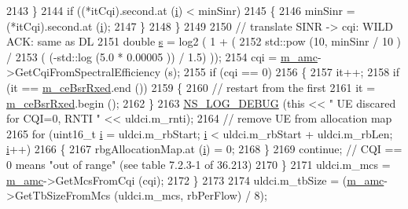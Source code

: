 \begin{DoxyCode}
2143                 \}
2144               \textcolor{keywordflow}{if} ((*itCqi).second.at (\hyperlink{bernuolliDistribution_8m_a6f6ccfcf58b31cb6412107d9d5281426}{i}) < minSinr)
2145                 \{
2146                   minSinr = (*itCqi).second.at (\hyperlink{bernuolliDistribution_8m_a6f6ccfcf58b31cb6412107d9d5281426}{i});
2147                 \}
2148             \}
2149 
2150           \textcolor{comment}{// translate SINR -> cqi: WILD ACK: same as DL}
2151           \textcolor{keywordtype}{double} \hyperlink{generate__test__data__lte__sinr_8m_ad83eeb3a142285d1243a08c6b7026df8}{s} = log2 ( 1 + (
2152                               std::pow (10, minSinr / 10 )  /
2153                               ( (-std::log (5.0 * 0.00005 )) / 1.5) ));
2154           cqi = \hyperlink{classns3_1_1CqaFfMacScheduler_aa32ec6c7683816a4afdb922f73c0fdc6}{m\_amc}->GetCqiFromSpectralEfficiency (s);
2155           \textcolor{keywordflow}{if} (cqi == 0)
2156             \{
2157               it++;
2158               \textcolor{keywordflow}{if} (it == \hyperlink{classns3_1_1CqaFfMacScheduler_ae2ec92c28a8adb7f5d63d658fd1e3949}{m\_ceBsrRxed}.end ())
2159                 \{
2160                   \textcolor{comment}{// restart from the first}
2161                   it = \hyperlink{classns3_1_1CqaFfMacScheduler_ae2ec92c28a8adb7f5d63d658fd1e3949}{m\_ceBsrRxed}.begin ();
2162                 \}
2163               \hyperlink{group__logging_ga413f1886406d49f59a6a0a89b77b4d0a}{NS\_LOG\_DEBUG} (\textcolor{keyword}{this} << \textcolor{stringliteral}{" UE discared for CQI=0, RNTI "} << uldci.m\_rnti);
2164               \textcolor{comment}{// remove UE from allocation map}
2165               \textcolor{keywordflow}{for} (uint16\_t \hyperlink{bernuolliDistribution_8m_a6f6ccfcf58b31cb6412107d9d5281426}{i} = uldci.m\_rbStart; \hyperlink{bernuolliDistribution_8m_a6f6ccfcf58b31cb6412107d9d5281426}{i} < uldci.m\_rbStart + uldci.m\_rbLen; 
      \hyperlink{bernuolliDistribution_8m_a6f6ccfcf58b31cb6412107d9d5281426}{i}++)
2166                 \{
2167                   rbgAllocationMap.at (\hyperlink{bernuolliDistribution_8m_a6f6ccfcf58b31cb6412107d9d5281426}{i}) = 0;
2168                 \}
2169               \textcolor{keywordflow}{continue}; \textcolor{comment}{// CQI == 0 means "out of range" (see table 7.2.3-1 of 36.213)}
2170             \}
2171           uldci.m\_mcs = \hyperlink{classns3_1_1CqaFfMacScheduler_aa32ec6c7683816a4afdb922f73c0fdc6}{m\_amc}->GetMcsFromCqi (cqi);
2172         \}
2173 
2174       uldci.m\_tbSize = (\hyperlink{classns3_1_1CqaFfMacScheduler_aa32ec6c7683816a4afdb922f73c0fdc6}{m\_amc}->GetTbSizeFromMcs (uldci.m\_mcs, rbPerFlow) / 8);

\end{DoxyCode}
